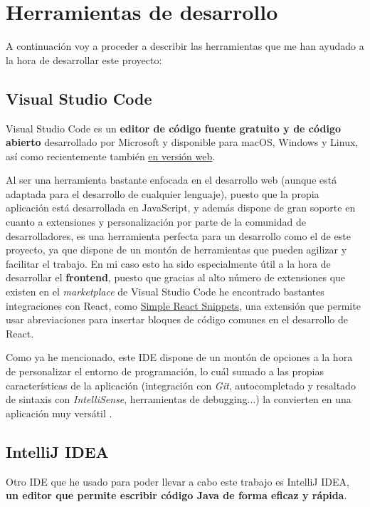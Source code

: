 \section{Herramientas de desarrollo}

A continuación voy a proceder a describir las herramientas que me han ayudado a la hora de desarrollar este proyecto:

\subsection{Visual Studio Code}

Visual Studio Code es un \textbf{editor de código fuente gratuito y de código abierto} desarrollado por Microsoft y disponible para macOS, Windows y Linux, así como recientemente también \href{https://vscode.dev}{en versión web}.

Al ser una herramienta bastante enfocada en el desarrollo web (aunque está adaptada para el desarrollo de cualquier lenguaje), puesto que la propia aplicación está desarrollada en JavaScript, y además dispone de gran soporte en cuanto a extensiones y personalización por parte de la comunidad de desarrolladores, es una herramienta perfecta para un desarrollo como el de este proyecto, ya que dispone de un montón de herramientas que pueden agilizar y facilitar el trabajo. En mi caso esto ha sido especialmente útil a la hora de desarrollar el \textbf{frontend}, puesto que gracias al alto número de extensiones que existen en el \textit{marketplace} de Visual Studio Code he encontrado bastantes integraciones con React, como \href{https://marketplace.visualstudio.com/items?itemName=burkeholland.simple-react-snippets}{Simple React Snippets}, una extensión que permite usar abreviaciones para insertar bloques de código comunes en el desarrollo de React.

Como ya he mencionado, este IDE dispone de un montón de opciones a la hora de personalizar el entorno de programación, lo cuál sumado a las propias características de la aplicación (integración con \textit{Git}, autocompletado y resaltado de sintaxis con \textit{IntelliSense}, herramientas de debugging...) la convierten en una aplicación muy versátil \cite{vscode:main}.

\subsection{IntelliJ IDEA}

Otro IDE que he usado para poder llevar a cabo este trabajo es IntelliJ IDEA, \textbf{un editor que permite escribir código Java de forma eficaz y rápida}. 

